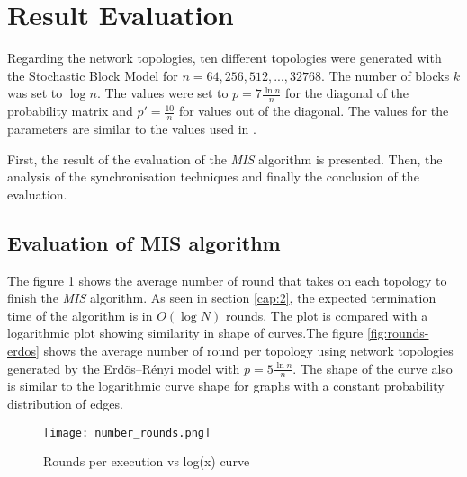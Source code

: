 \section{Result Evaluation}
\label{chap:6}
Regarding the network topologies, ten different topologies were generated with the Stochastic Block Model for $n = 64, 256, 512,..., 32768$. The number of blocks $k$ was set to $\log n$. The values were set to $p = 7{\tfrac {\ln n}{n}}$ for the diagonal of the probability matrix and  $p\prime = {\tfrac {10}{n}}$ for values out of the diagonal. The values for the parameters are similar to the values used in \cite{kothapalli2013analysis}.

First, the result of the evaluation of the \textit{MIS} algorithm is presented. Then, the analysis of the synchronisation techniques and finally the conclusion of the evaluation.



\subsection{Evaluation of MIS algorithm}

The figure \ref{fig:rounds_execution} shows the average number of round that takes on each topology to finish the \textit{MIS} algorithm. As seen in section \ref{cap:2}, the expected termination time of the algorithm is in $O(\log N)$ rounds. The plot is compared with a logarithmic plot showing similarity in shape of curves.The figure \ref{fig:rounds-erdos} shows the average number of round per topology using network topologies generated by the Erd\~os--R\'enyi model with  $p = 5{\tfrac {\ln n}{n}}$. The shape of the curve also is similar to the logarithmic curve shape for graphs with a constant probability distribution of edges.


\begin{figure}[ht]
\centering
\texttt{[image: number\_rounds.png]} 
\caption{Rounds per execution vs log(x) curve}
\label{fig:rounds_execution}
\end{figure}



